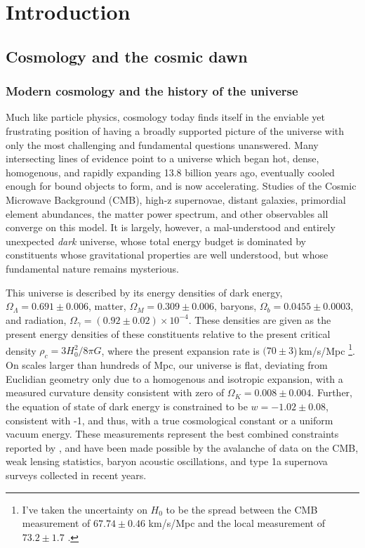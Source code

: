 \chapter{Introduction}


\section{Cosmology and the cosmic dawn}

\subsection{Modern cosmology and the history of the universe}

Much like particle physics, cosmology today finds itself in the enviable yet frustrating position of having a broadly supported picture of the universe with only the most challenging and fundamental questions unanswered. Many intersecting lines of evidence point to a universe which began hot, dense, homogenous, and rapidly expanding 13.8 billion years ago, eventually cooled enough for bound objects to form, and is now accelerating. Studies of the Cosmic Microwave Background (CMB), high-z supernovae, distant galaxies, primordial element abundances, the matter power spectrum, and other observables all converge on this model. It is largely, however, a mal-understood and entirely unexpected \textit{dark} universe, whose total energy budget is dominated by constituents whose gravitational properties are well understood, but whose fundamental nature remains mysterious. 

This universe is described by its energy densities of dark energy, $\Omega_\Lambda=0.691\pm0.006$, matter, $\Omega_M=0.309\pm0.006$, baryons, $\Omega_b=0.0455\pm0.0003$, and radiation, $\Omega_\gamma=(0.92\pm0.02)\times10^{-4}$. These densities are given as the present energy densities of these constituents relative to the present critical density $\rho_c=3H_0^2/8\pi G$, where the present expansion rate is $(70\pm3$)\,km/s/Mpc \footnote{I've taken the uncertainty on $H_0$ to be the spread between the CMB measurement of $67.74\pm0.46$ km/s/Mpc \citep{planck16} and the local measurement of $73.2\pm1.7$ \citep{reiss16}.}. On scales larger than hundreds of Mpc, our universe is flat, deviating from Euclidian geometry only due to a homogenous and isotropic expansion, with a measured curvature density consistent with zero of $\Omega_K=0.008\pm0.004$. Further, the equation of state of dark energy is constrained to be $w=-1.02\pm0.08$, consistent with -1, and thus, with a true cosmological constant or a uniform vacuum energy. These measurements represent the best combined constraints reported by \citet{planck16}, and have been made possible by the avalanche of data on the CMB, weak lensing statistics, baryon acoustic oscillations, and type 1a supernova surveys collected in recent years. 

